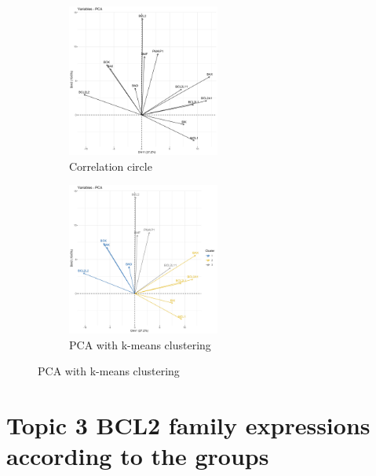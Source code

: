 \documentclass{article}
\begin{document}
\begin{enumerate}
\begin{figure}[H]
        \begin{subfigure}{0.5\textwidth}
        \includegraphics[width = 0.9\linewidth, height = 5cm]{Image/correlation_circle.jpg}
        \caption{Correlation circle}
        \end{subfigure}
        \begin{subfigure}{0.5\textwidth}
        \includegraphics[width = 0.9\linewidth, height = 5cm]{Image/PCA_plot_grp.jpg}
        \caption{PCA with k-means clustering}
        \end{subfigure}
        
    \end{figure}
    
\end{enumerate}

\section*{Topic 3 BCL2 family expressions according to the groups}
\end{document}

